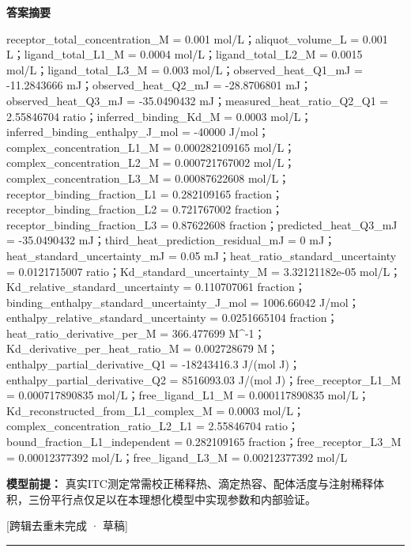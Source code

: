\documentclass[UTF8,11pt,a4paper]{ctexart}
\begin{document}
\noindent\textbf{答案摘要}\par
receptor\_total\_concentration\_M = 0.001 mol/L；aliquot\_volume\_L = 0.001 L；ligand\_total\_L1\_M = 0.0004 mol/L；ligand\_total\_L2\_M = 0.0015 mol/L；ligand\_total\_L3\_M = 0.003 mol/L；observed\_heat\_Q1\_mJ = -11.2843666 mJ；observed\_heat\_Q2\_mJ = -28.8706801 mJ；observed\_heat\_Q3\_mJ = -35.0490432 mJ；measured\_heat\_ratio\_Q2\_Q1 = 2.55846704 ratio；inferred\_binding\_Kd\_M = 0.0003 mol/L；inferred\_binding\_enthalpy\_J\_mol = -40000 J/mol；complex\_concentration\_L1\_M = 0.000282109165 mol/L；complex\_concentration\_L2\_M = 0.000721767002 mol/L；complex\_concentration\_L3\_M = 0.00087622608 mol/L；receptor\_binding\_fraction\_L1 = 0.282109165 fraction；receptor\_binding\_fraction\_L2 = 0.721767002 fraction；receptor\_binding\_fraction\_L3 = 0.87622608 fraction；predicted\_heat\_Q3\_mJ = -35.0490432 mJ；third\_heat\_prediction\_residual\_mJ = 0 mJ；heat\_standard\_uncertainty\_mJ = 0.05 mJ；heat\_ratio\_standard\_uncertainty = 0.0121715007 ratio；Kd\_standard\_uncertainty\_M = 3.32121182e-05 mol/L；Kd\_relative\_standard\_uncertainty = 0.110707061 fraction；binding\_enthalpy\_standard\_uncertainty\_J\_mol = 1006.66042 J/mol；enthalpy\_relative\_standard\_uncertainty = 0.0251665104 fraction；heat\_ratio\_derivative\_per\_M = 366.477699 M\textasciicircum{}-1；Kd\_derivative\_per\_heat\_ratio\_M = 0.002728679 M；enthalpy\_partial\_derivative\_Q1 = -18243416.3 J/(mol J)；enthalpy\_partial\_derivative\_Q2 = 8516093.03 J/(mol J)；free\_receptor\_L1\_M = 0.000717890835 mol/L；free\_ligand\_L1\_M = 0.000117890835 mol/L；Kd\_reconstructed\_from\_L1\_complex\_M = 0.0003 mol/L；complex\_concentration\_ratio\_L2\_L1 = 2.55846704 ratio；bound\_fraction\_L1\_independent = 0.282109165 fraction；free\_receptor\_L3\_M = 0.00012377392 mol/L；free\_ligand\_L3\_M = 0.00212377392 mol/L\par
\noindent\textbf{模型前提：}
真实ITC测定常需校正稀释热、滴定热容、配体活度与注射稀释体积，三份平行点仅足以在本理想化模型中实现参数和内部验证。\par
\noindent\textcolor{red!65!black}{[跨辑去重未完成 · 草稿]} \par
\medskip\hrule\medskip
{}
\end{document}
